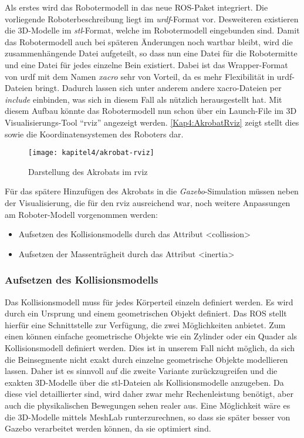 Als erstes wird das Robotermodell in das neue \ac{ROS}-Paket integriert. Die vorliegende Roboterbeschreibung liegt im \textit{urdf}-Format vor. Desweiteren existieren die 3D-Modelle im \textit{stl}-Format, welche im Robotermodell eingebunden sind. Damit das Robotermodell auch bei späteren Änderungen noch wartbar bleibt, wird die zusammenhängende Datei aufgeteilt, so dass nun eine Datei für die Robotermitte und eine Datei für jedes einzelne Bein existiert. Dabei ist das Wrapper-Format von urdf mit dem Namen \textit{xacro} sehr von Vorteil, da es mehr Flexibilität in urdf-Dateien bringt. Dadurch lassen sich unter anderem andere xacro-Dateien per \textit{include} einbinden, was sich in diesem Fall als nützlich herausgestellt hat. Mit diesem Aufbau könnte das Robotermodell nun schon über ein Launch-File im 3D Visualisierungs-Tool "`rviz"' angezeigt werden. \autoref{Kap4:AkrobatRviz} zeigt stellt dies sowie die Koordinatensystemen des Roboters dar.

\begin{figure}[b!]
  \centering
  \texttt{[image: kapitel4/akrobat-rviz]}
  \caption{Darstellung des Akrobats im rviz}
  \label{Kap4:AkrobatRviz}
\end{figure}

Für das spätere Hinzufügen des Akrobats in die \textit{Gazebo}-Simulation müssen neben der Visualisierung, die für den rviz ausreichend war, noch weitere Anpassungen am Roboter-Modell vorgenommen werden:
\begin{itemize}
  \item Aufsetzen des Kollisionsmodells durch das Attribut <collission>
  \item Aufsetzen der Massenträgheit durch das Attribut <inertia>
\end{itemize}

\subsubsection{Aufsetzen des Kollisionsmodells}

Das Kollisionsmodell muss für jedes Körperteil einzeln definiert werden. Es wird durch ein Ursprung und einem geometrischen Objekt definiert. Das \ac{ROS} stellt hierfür eine Schnittstelle zur Verfügung, die zwei Möglichkeiten anbietet. Zum einen können einfache geometrische Objekte wie ein Zylinder oder ein Quader als Kollisionsmodell definiert werden. Dies ist in unserem Fall nicht möglich, da sich die Beinsegmente nicht exakt durch einzelne geometrische Objekte modellieren lassen. Daher ist es sinnvoll auf die zweite Variante zurückzugreifen und die exakten 3D-Modelle über die stl-Dateien als Kollisionsmodelle anzugeben. Da diese viel detaillierter sind, wird daher zwar mehr Rechenleistung benötigt, aber auch die physikalischen Bewegungen sehen realer aus. Eine Möglichkeit wäre es die 3D-Modelle mittels MeshLab \autocite{LocalChapterEvents:ItalChap:ItalianChapConf2008:129-136} runterzurechnen, so dass sie später besser von Gazebo verarbeitet werden können, da sie optimiert sind.


